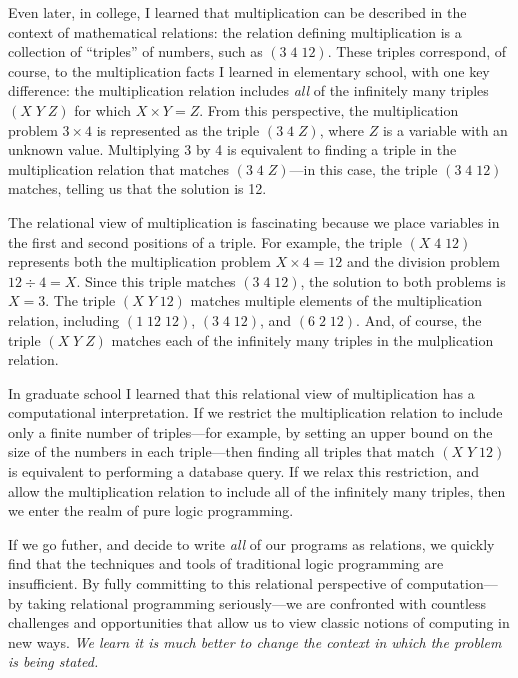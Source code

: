 

Even later, in college, I learned that multiplication can be
described in the context of mathematical relations: the relation
defining multiplication is a collection of ``triples'' of numbers,
such as \mbox{$(3\; 4\; 12)$}.
%
These triples correspond, of course, to the multiplication facts I
learned in elementary school, with one key difference: the
multiplication relation includes \emph{all} of the infinitely many
triples \mbox{$(X\; Y\; Z)$} for which \mbox{$X \times Y = Z$}.
%
From this perspective, the multiplication problem \mbox{$3 \times 4$}
is represented as the triple \mbox{$(3\; 4\; Z)$}, where $Z$ is a
variable with an unknown value.
%
Multiplying 3 by 4 is equivalent to finding a triple in the
multiplication relation that matches \mbox{$(3\; 4\; Z)$}---in this
case, the triple \mbox{$(3\; 4\; 12)$} matches, telling us that the
solution is 12.

The relational view of multiplication is fascinating because we place
variables in the first and second positions of a triple.
%
For example, the triple \mbox{$(X\; 4\; 12)$} represents both the
multiplication problem \mbox{$X \times 4 = 12$} and the division
problem \mbox{$12 \div 4 = X$}.
%
Since this triple matches \mbox{$(3\; 4\; 12)$}, the solution to both
problems is $X = 3$.
%
The triple \mbox{$(X\; Y\; 12)$} matches multiple elements of the
multiplication relation, including \mbox{$(1\; 12\; 12)$},
\mbox{$(3\; 4\; 12)$}, and \mbox{$(6\; 2\; 12)$}.
%
And, of course, the triple \mbox{$(X\; Y\; Z)$} matches each of the
infinitely many triples in the mulplication relation.


In graduate school I learned that this relational view of
multiplication has a computational interpretation.
%
If we restrict the multiplication relation to include only a finite
number of triples---for example, by setting an upper bound on the size
of the numbers in each triple---then finding all triples that match
\mbox{$(X\; Y\; 12)$} is equivalent to performing a database query.
%
If we relax this restriction, and allow the multiplication relation to
include all of the infinitely many triples, then we enter the realm of
pure logic programming.

If we go futher, and decide to write \emph{all} of our programs as
relations, we quickly find that the techniques and tools of
traditional logic programming are insufficient.
%
By fully committing to this relational perspective of computation---by
taking relational programming seriously---we are confronted with
countless challenges and opportunities that allow us to view classic
notions of computing in new ways.
%
\emph{We learn it is much better to change the context in which the problem is being stated.}





